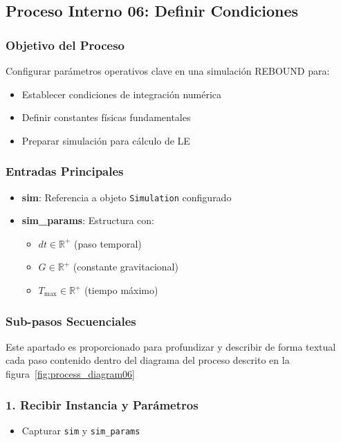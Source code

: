 \subsection{Proceso Interno 06: Definir Condiciones}

\subsubsection{Objetivo del Proceso}
Configurar parámetros operativos clave en una simulación REBOUND para:
\begin{itemize}
    \item Establecer condiciones de integración numérica
    \item Definir constantes físicas fundamentales
    \item Preparar simulación para cálculo de LE
\end{itemize}

\subsubsection{Entradas Principales}
\begin{itemize}
    \item \textbf{sim}: Referencia a objeto \texttt{Simulation} configurado
    \item \textbf{sim\_params}: Estructura con:
    \begin{itemize}
        \item $dt \in \mathbb{R}^+$ (paso temporal)
        \item $G \in \mathbb{R}^+$ (constante gravitacional)
        \item $T_{\text{max}} \in \mathbb{R}^+$ (tiempo máximo)
    \end{itemize}
\end{itemize}

\subsubsection{Sub-pasos Secuenciales}
Este apartado es proporcionado para profundizar y describir de forma textual cada paso contenido dentro del diagrama del proceso descrito en la figura~\ref{fig:process_diagram06}
\subsubsection*{1. Recibir Instancia y Parámetros}
\begin{itemize}
    \item Capturar \texttt{sim} y \texttt{sim\_params}
\end{itemize}

